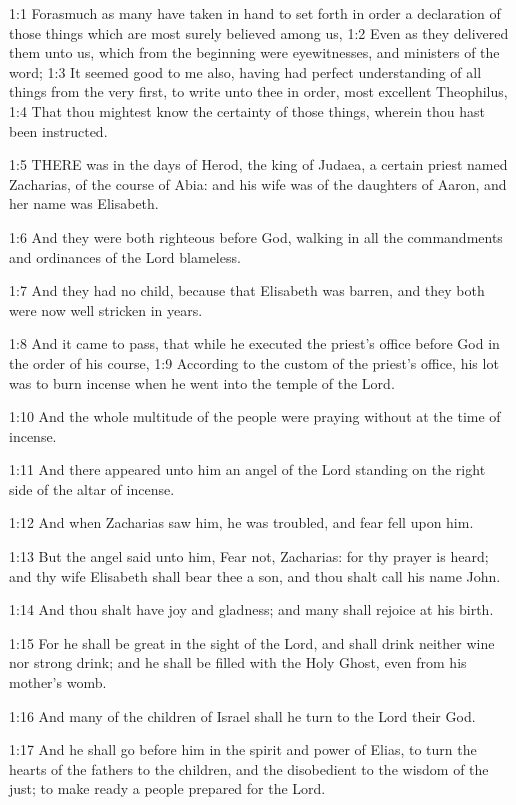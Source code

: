 

1:1 Forasmuch as many have taken in hand to set forth in order a
declaration of those things which are most surely believed among us,
1:2 Even as they delivered them unto us, which from the beginning were
eyewitnesses, and ministers of the word; 1:3 It seemed good to me
also, having had perfect understanding of all things from the very
first, to write unto thee in order, most excellent Theophilus, 1:4
That thou mightest know the certainty of those things, wherein thou
hast been instructed.

1:5 THERE was in the days of Herod, the king of Judaea, a certain
priest named Zacharias, of the course of Abia: and his wife was of the
daughters of Aaron, and her name was Elisabeth.

1:6 And they were both righteous before God, walking in all the
commandments and ordinances of the Lord blameless.

1:7 And they had no child, because that Elisabeth was barren, and they
both were now well stricken in years.

1:8 And it came to pass, that while he executed the priest's office
before God in the order of his course, 1:9 According to the custom of
the priest's office, his lot was to burn incense when he went into the
temple of the Lord.

1:10 And the whole multitude of the people were praying without at the
time of incense.

1:11 And there appeared unto him an angel of the Lord standing on the
right side of the altar of incense.

1:12 And when Zacharias saw him, he was troubled, and fear fell upon
him.

1:13 But the angel said unto him, Fear not, Zacharias: for thy prayer
is heard; and thy wife Elisabeth shall bear thee a son, and thou shalt
call his name John.

1:14 And thou shalt have joy and gladness; and many shall rejoice at
his birth.

1:15 For he shall be great in the sight of the Lord, and shall drink
neither wine nor strong drink; and he shall be filled with the Holy
Ghost, even from his mother's womb.

1:16 And many of the children of Israel shall he turn to the Lord
their God.

1:17 And he shall go before him in the spirit and power of Elias, to
turn the hearts of the fathers to the children, and the disobedient to
the wisdom of the just; to make ready a people prepared for the Lord.

